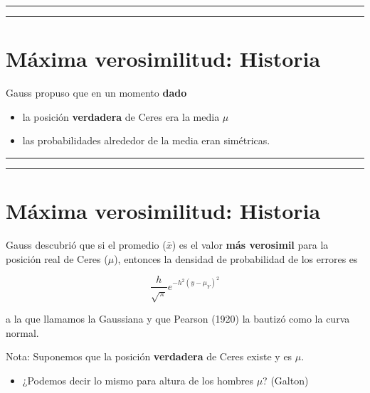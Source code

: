 \documentclass[
]{book}
\providecommand{\tightlist}{%
  \setlength{\itemsep}{0pt}\setlength{\parskip}{0pt}}
\begin{document}
\begin{center}\rule{0.5\linewidth}{0.5pt}\end{center}

\begin{center}\rule{0.5\linewidth}{0.5pt}\end{center}

\hypertarget{muxe1xima-verosimilitud-historia-1}{%
\section{Máxima verosimilitud: Historia}\label{muxe1xima-verosimilitud-historia-1}}

Gauss propuso que en un momento \textbf{dado}

\begin{itemize}
\tightlist
\item
  la posición \textbf{verdadera} de Ceres era la media \(\mu\)
\item
  las probabilidades alrededor de la media eran simétricas.
\end{itemize}

\begin{center}\rule{0.5\linewidth}{0.5pt}\end{center}

\begin{center}\rule{0.5\linewidth}{0.5pt}\end{center}

\hypertarget{muxe1xima-verosimilitud-historia-2}{%
\section{Máxima verosimilitud: Historia}\label{muxe1xima-verosimilitud-historia-2}}

Gauss descubrió que si el promedio (\(\bar{x}\)) es el valor \textbf{más verosimil} para la posición real de Ceres (\(\mu\)), entonces la densidad de probabilidad de los errores es

\[\frac{h}{\sqrt{\pi}}e^{-h^2(y-\mu_Y)^2}\]

a la que llamamos la Gaussiana y que Pearson (1920) la bautizó como la curva normal.

Nota: Suponemos que la posición \textbf{verdadera} de Ceres existe y es \(\mu\).

\begin{itemize}
\tightlist
\item
  ¿Podemos decir lo mismo para altura de los hombres \(\mu\)? (Galton)
\end{itemize}
\end{document}
